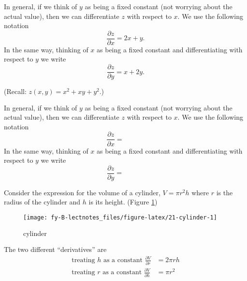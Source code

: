\documentclass[
  english,
  11pt,
  oneside]{book}
\newcommand{\slide}{}
\theoremstyle{definition}
\theoremstyle{definition}
\theoremstyle{definition}
\theoremstyle{definition}
\theoremstyle{remark}
\begin{document}
\begin{notslides}

In general, if we think of \(y\) as being a fixed constant (not worrying about the actual value), then we can differentiate \(z\) with respect to \(x\). We use the following notation
\[
\frac{\partial z}{\partial x} = 2x+y.
\]
In the same way, thinking of \(x\) as being a fixed constant and differentiating with respect to \(y\) we write
\[
\frac{\partial z}{\partial y} = x + 2y.
\]

\end{notslides}

\begin{slidesonly}

(Recall: \(z(x,y) = x^2+xy+y^2\).)

In general, if we think of \(y\) as being a fixed constant (not worrying about the actual value), then we can differentiate \(z\) with respect to \(x\). We use the following notation
\[
\frac{\partial z}{\partial x} = \phantom{2x+y.}
\]
In the same way, thinking of \(x\) as being a fixed constant and differentiating with respect to \(y\) we write
\[
\frac{\partial z}{\partial y} = \phantom{x + 2y.}
\]

\slide

\end{slidesonly}

Consider the expression for the volume of a cylinder, \(V = \pi r^2h\) where \(r\) is the radius of the cylinder and \(h\) is its height. (Figure \ref{fig:21-cylinder})

\begin{figure}

{\centering \texttt{[image: fy-B-lectnotes\_files/figure-latex/21-cylinder-1]} 

}

\caption{cylinder}\label{fig:21-cylinder}
\end{figure}

\begin{notslides}

The two different ``derivatives'' are
\begin{align*}
\text{treating }h\text{ as a constant } \frac{\partial V}{\partial r} &= 2\pi rh\\
\text{treating }r\text{ as a constant } \frac{\partial V}{\partial h} &= \pi r^2
\end{align*}

\end{notslides}
\end{document}
